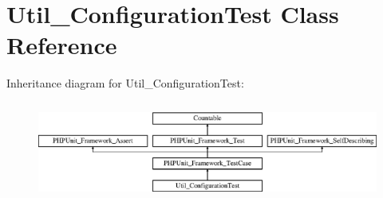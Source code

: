 \hypertarget{class_util___configuration_test}{}\section{Util\+\_\+\+Configuration\+Test Class Reference}
\label{class_util___configuration_test}
Inheritance diagram for Util\+\_\+\+Configuration\+Test\+:\begin{figure}[H]
\begin{center}
\leavevmode
\includegraphics[height=3.303835cm]{class_util___configuration_test}
\end{center}
\end{figure}
